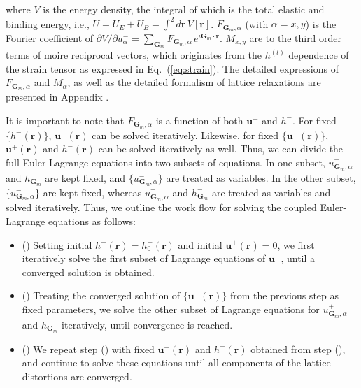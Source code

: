 \documentclass[aps,prx,10pt,twocolumn,superscriptaddress]{revtex4}
\def\II{\uppercase\expandafter{\romannumeral 2}}
\def\i{\lowercase\expandafter{\romannumeral 1}}
\def\ii{\lowercase\expandafter{\romannumeral 2}}
\def\iii{{\lowercase\expandafter{\romannumeral 3}}}
\begin{document}
where $V$ is the energy density, the integral of which is the total elastic and binding energy, i.e., $U=U_E+U_B=\int^2d\mathbf{r}\,V[\mathbf{r}]$. 
$F_{\textbf{G}_m,\alpha}$ (with $\alpha\!=\!x,y$) is the Fourier coefficient of $\partial V/\partial u_{\alpha}^{-}=\sum_{\textbf{G}_m} F_{\textbf{G}_m,\alpha}\,e^{i\textbf{G}_m\cdot\mathbf{r}}$. $M_{x,y}$ are to the third order terms of moire reciprocal vectors, which originates from the $h^{(l)}$ dependence of the strain tensor as expressed in Eq.~(\ref{eq:strain}). The detailed expressions of  $F_{\textbf{G}_{m},\alpha}$ and $M_{\alpha}$, as well as the detailed formalism of lattice relaxations are presented in Appendix \II.

It is  important to note that $F_{\textbf{G}_m,\alpha}$ is a function of both $\textbf{u}^{-}$ and $h^{-}$. For  fixed $\{h^{-}(\mathbf{r})\}$, $\textbf{u}^{-}(\mathbf{r})$ can be solved iteratively. Likewise, for  fixed $\{\textbf{u}^{-}(\mathbf{r})\}$, $\textbf{u}^{+}(\mathbf{r})$ and $h^{-}(\mathbf{r})$ can be solved iteratively as well. Thus, we can divide the full Euler-Lagrange equations into two subsets of equations. In one subset, $u^{+}_{\textbf{G}_{m},\alpha}$ and $h^{-}_{\textbf{G}_{m}}$ are kept fixed, and  $\{u^{-}_{\textbf{G}_{m},\alpha}\}$ are treated as variables. 
In the other subset, $\{u^{-}_{\textbf{G}_{m},\alpha}\}$ are kept fixed, whereas $u^{+}_{\textbf{G}_{m},\alpha}$ and $h^{-}_{\textbf{G}_{m}}$ are treated as variables and solved iteratively.
Thus, we outline the work flow for solving the coupled Euler-Lagrange equations as follows: 
\begin{itemize}
\item (\i) Setting initial $h^{-}(\mathbf{r})\!=\!h^{-}_0(\mathbf{r})$ and initial $\mathbf{u}^{+}(\mathbf{r})=0$, we first iteratively solve the first subset of Lagrange equations of $\textbf{u}^{-}$, until a converged solution is obtained.
\item (\ii) Treating the converged solution of $\{\textbf{u}^{-}(\mathbf{r})\}$ from the previous step as fixed parameters, we solve the other subset of Lagrange equations for $u^{+}_{\textbf{G}_{m},\alpha}$ and $h^{-}_{\textbf{G}_{m}}$ iteratively, until convergence is reached.
\item(\iii) We repeat step (\i) with fixed  $\textbf{u}^{+}(\mathbf{r})$ and $h^{-}(\mathbf{r})$ obtained from step (\ii), and continue to solve these equations until all components of the lattice distortions are converged.
\end{itemize}
\end{document}
